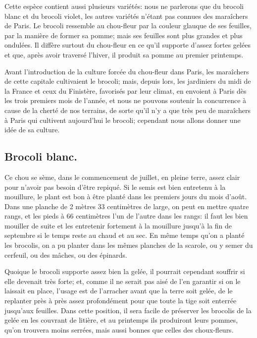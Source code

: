\documentclass[10pt,a4paper]{book}
\begin{document}
Cette espèce contient aussi plusieurs variétés: nous ne parlerons que du brocoli blanc et du brocoli violet, les autres variétés n'étant pas connues des maraîchers de Paris. Le brocoli ressemble au chou-fleur par la couleur glauque de ses feuilles, par la manière de former sa pomme; mais ses feuilles sont plus grandes et plus ondulées. Il diffère surtout du chou-fleur en ce qu'il supporte d'assez fortes gelées et que, après avoir traversé l'hiver, il produit sa pomme au premier printemps.

Avant l'introduction de la culture forcée du chou-fleur dans Paris, les maraîchers de cette capitale cultivaient le brocoli; mais, depuis lors, les jardiniers du midi de la France et ceux du Finistère, favorisés par leur climat, en envoient à Paris dès les trois premiers mois de l'année, et nous ne pouvons soutenir la concurrence à cause de la cherté de nos terrains, de sorte qu'il n'y a que très peu de maraîchers à Paris qui cultivent aujourd'hui le brocoli; cependant nous allons donner une idée de sa culture.

\subsection{Brocoli blanc.}

Ce chou se sème, dans le commencement de juillet, en pleine terre, assez clair pour n'avoir pas besoin d'être repiqué. Si le semis est bien entretenu à la mouillure, le plant est bon à être planté dans les premiers jours du mois d'août. Dans une planche de 2 mètres 33 centimètres de large, on peut en mettre quatre rangs, et les pieds à 66 centimètres l'un de l'autre dans les rangs: il faut les bien mouiller de suite et les entretenir fortement à la mouillure jusqu'à la fin de septembre si le temps reste au chaud et au sec. En même temps qu'on a planté les brocolis, on a pu planter dans les mêmes planches de la scarole, ou y semer du cerfeuil, ou des mâches, ou des épinards.

Quoique le brocoli supporte assez bien la gelée, il pourrait cependant souffrir si elle devenait très forte; et, comme il ne serait pas aisé de l'en garantir si on le laissait en place, l'usage est de l'arracher avant que la terre soit gelée, de le replanter près à près assez profondément pour que toute la tige soit enterrée jusqu'aux feuilles. Dans cette position, il sera facile de préserver les brocolis de la gelée en les couvrant de litière, et au printemps ils produiront leurs pommes, qu'on trouvera moins serrées, mais aussi bonnes que celles des choux-fleurs.
\end{document}

